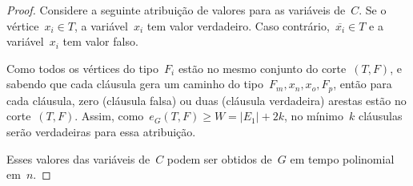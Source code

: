 \begin{proof}
		Considere a seguinte atribuição de valores para as variáveis
		de~$C$.
		Se o vértice~$x_i\in T$, a variável~$x_i$ tem valor verdadeiro.
		Caso contrário,~$\overline{x_i}\in T$ e a variável~$x_i$ tem valor falso.


		Como todos os vértices do tipo~$F_i$ estão no mesmo conjunto
		do corte~$(T,F)$, e sabendo que cada cláusula gera um 
		caminho do tipo~$F_m,x_n,x_o,F_p$, então
		para cada cláusula,
		zero (cláusula falsa) ou duas (cláusula verdadeira) arestas 
		estão no corte~$(T,F)$.
		Assim, como~${e_G(T,F)\ge W = |E_1|+2k}$,
		 no mínimo~$k$ cláusulas serão verdadeiras
		 para essa atribuição. 

		
		
		Esses valores das variáveis de~$C$ podem ser obtidos de~$G$ em
		tempo polinomial em~$n$.
	\end{proof}






